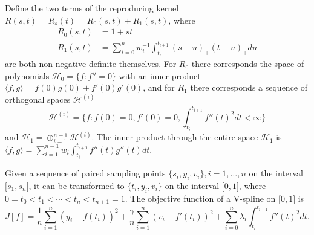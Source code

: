 Define the two terms of the reproducing kernel $R(s,t)=R_s(t)=R_0(s,t)+R_1(s,t)$, where
\begin{align}
R_0(s,t)&=1+st \\
R_1(s,t)&=\sum_{i=0}^{n}w_i^{-1}\int_{t_i}^{t_{i+1}}(s-u)_+(t-u)_+du
\end{align}
are both non-negative definite themselves. For $R_0$ there corresponds the space of polynomials $\mathcal{H}_0=\lbrace f:f''=0\rbrace$ with an inner product $\langle f,g\rangle = f(0)g(0)+f'(0)g'(0)$, and for $R_1$ there corresponds a sequence of orthogonal spaces $\mathcal{H}^{(i)}$
\begin{equation*}
\mathcal{H}^{(i)} = \lbrace f:f(0)=0,f'(0)=0,\int_{t_i}^{t_{i+1}}f''(t)^2dt<\infty \rbrace 
\end{equation*}
and $\mathcal{H}_1=\oplus _{i=1}^{n-1}\mathcal{H}^{(i)}$. The inner product through the entire space $\mathcal{H}_1$ is $\langle f,g \rangle = \sum_{i=1}^{n-1}w_i\int_{t_i}^{t_{i+1}}f''(t)g''(t)dt$. 


Given a sequence of paired sampling points $\lbrace s_i,y_i,v_i \rbrace, i=1,\ldots,n$ on the interval $\lbrack s_1,s_n\rbrack$, it can be transformed to $\lbrace t_i,y_i,v_i \rbrace$ on the interval $\lbrack 0,1\rbrack$, where $0=t_0<t_1<\cdots <t_n<t_{n+1}=1$. The objective function of a V-spline on $\lbrack 0,1\rbrack$ is  
\begin{equation}\label{maineq2}
J[f]=\frac{1}{n}\sum_{i=1}^{n}\left(y_i-f(t_i)\right)^2+\frac{\gamma}{n}\sum_{i=1}^{n}\left(v_i-f'(t_i)\right)^2+\sum_{i=0}^{n}\lambda_i\int_{t_i}^{t_{i+1}}f''(t)^2dt.
\end{equation}


